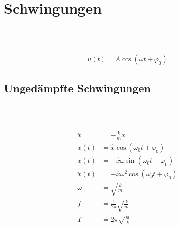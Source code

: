 
\section{Schwingungen}


\begin{boxleft}
\\
\\
\end{boxleft}\begin{boxrightshaded}
\begin{align*}
u(t)=A\cos(\omega t+\varphi_0)
\end{align*}
\end{boxrightshaded}

\subsection{Ungedämpfte Schwingungen}

\begin{boxleft}
\\
\\
\end{boxleft}\begin{boxrightshaded}
\begin{align*}
\ddot{x}&=-\frac{k}{m}x\\
x(t)&=\hat{x}\cos(\omega_0 t+\varphi_0)\\
\dot{x}(t)&=-\hat{x}\omega\sin(\omega_0 t+\varphi_0)\\
\ddot{x}(t)&=-\hat{x}\omega^2\cos(\omega_0 t+\varphi_0)\\
\omega&=\sqrt{\frac{k}{m}}\\
f&=\frac{1}{2\pi}\sqrt{\frac{k}{m}}\\
T&=2\pi\sqrt{\frac{m}{k}}
\end{align*}
\end{boxrightshaded}

